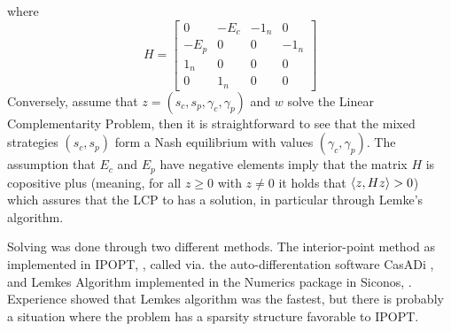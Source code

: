 where
\[
  H =
  \left[
    \begin{array}{cccc}
      0 & -E_c & -1_n & 0 \\ -E_p & 0 & 0 & -1_n \\
      1_n & 0 & 0 & 0 \\
      0 & 1_n & 0 & 0
    \end{array}
  \right]
\]
Conversely, assume that $z=(s_c,s_p,\gamma_c,\gamma_p)$ and $w$ solve the Linear Complementarity Problem, then it is straightforward to see that the mixed strategies $(s_c,s_p)$ form a Nash equilibrium with values $(\gamma_c,\gamma_p)$. The assumption that $E_c$ and $E_p$ have negative elements imply that the matrix $H$ is copositive plus (meaning, for all $z\geq0$ with $z\neq0$ it holds that $\left \langle z,Hz \right \rangle>0$) which assures that the LCP to has a solution, in particular through Lemke's algorithm.

Solving  was done through two different methods. The interior-point method as implemented in IPOPT, \citep{wachter2006implementation}, called via. the auto-differentation software CasADi \citep{Andersson2019}, and Lemkes Algorithm implemented in the Numerics package in Siconos, \citep{acary2019introduction}. Experience showed that Lemkes algorithm was the fastest, but there is probably a situation where the problem has a sparsity structure favorable to IPOPT.




